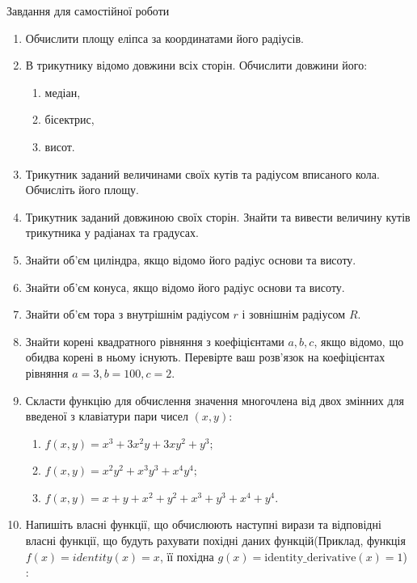 \documentclass[]{article}
\makeatletter
\newcommand{\xslalph}[1]{\expandafter\@xslalph\csname c@#1\endcsname}
\newcommand{\@xslalph}[1]{%
    \ifcase#1\or а\or б\or в\or г\or д\or e\or є\or ж\or з\or i%
    \or й\or к\or л\or м\or н\or о\or п\or р\or с\or т%
    \or у\or ф\or х\or ц\or ч\or ш\or ю\or я\or аа\or бб\or вв%
    \else\@ctrerr\fi%
}
\makeatother
\begin{document}
Завдання для самостійної роботи

\begin{enumerate}
\def\labelenumi{\arabic{enumi})}
\setcounter{enumi}{7}
\item
  Обчислити площу еліпса за координатами його радіусів.
\item
  В трикутнику відомо довжини всіх сторін. Обчислити довжини його:
  \begin{enumerate}[label=\xslalph*)]
   \item
    медіан,
   \item
    бісектрис,
    \item
    висот.
  \end{enumerate}
\item
  Трикутник заданий величинами своїх кутів та радіусом вписаного кола.
  Обчисліть його площу.
\item
  Трикутник заданий довжиною своїх сторін. Знайти та вивести величину
  кутів трикутника у радіанах та градусах.
\item
  Знайти об'єм циліндра, якщо відомо його радіус основи та висоту.
\item
  Знайти об'єм конуса, якщо відомо його радіус основи та висоту.
\item
  Знайти об'єм тора з внутрішнім радіусом \(r\) і зовнішнім радіусом
  \(R\).
\item
  Знайти корені квадратного рівняння з коефіцієнтами \(a,b,c\), якщо відомо,
  що обидва корені в ньому існують. Перевірте ваш розв'язок на
  коефіцієнтах рівняння \(a=3,b=100,c=2\).
\item
  Скласти функцію для обчислення значення многочлена від двох змінних
  для введеної з клавіатури пари чисел \((x,y)\):
  \begin{enumerate}[label=\xslalph*)]
    \item
    \(f(x,y) = x^{3} + 3x^{2}y + 3xy^{2} + y^{3};\)
    \item
    \(f(x,y) = x^{2}y^{2} + x^{3}y^{3} + x^{4}y^{4};\)
    \item
    \(f(x,y) = x + y + x^{2} + y^{2} + x^{3} + y^{3} + x^{4} + y^{4}\).
  \end{enumerate}

\item
  Напишіть власні функції, що обчислюють наступні вирази та відповідні
  власні функції, що будуть рахувати похідні даних функцій(Приклад,
  функція \(f(x) = identity(x) = x\), її похідна
  \(g(x) = \textrm{identity\_derivative}(x) = 1\)) :



\end{enumerate}
\end{document}
